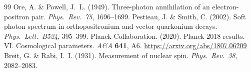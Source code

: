 \documentclass[12pt,a4paper]{article}
\begin{document}
\begin{thebibliography}{99}
     Ore, A. \& Powell, J.~L. (1949). Three-photon annihilation of an electron-positron pair. \textit{Phys.\ Rev.\ 75}, 1696--1699.
     Pestieau, J. \& Smith, C. (2002). Soft photon spectrum in orthopositronium and vector quarkonium decays. \textit{Phys.\ Lett.\ B524}, 395--399.
     Planck Collaboration. (2020). Planck 2018 results. VI. Cosmological parameters. \textit{A\&A} \textbf{641}, A6. \url{https://arxiv.org/abs/1807.06209}
     Breit, G. \& Rabi, I.~I. (1931). Measurement of nuclear spin. \textit{Phys.\ Rev.\ 38}, 2082--2083.
\end{thebibliography}
\end{document}
